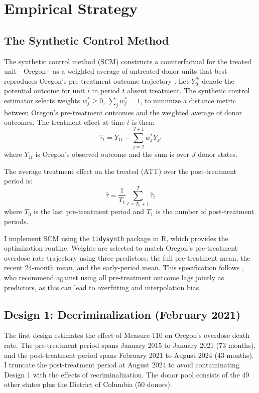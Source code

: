\documentclass[12pt]{article}
\begin{document}
\section{Empirical Strategy}

\subsection{The Synthetic Control Method}

The synthetic control method (SCM) constructs a counterfactual for the treated unit---Oregon---as a weighted average of untreated donor units that best reproduces Oregon's pre-treatment outcome trajectory \citep{abadie2003economic, abadie2010synthetic}. Let $Y_{it}^{N}$ denote the potential outcome for unit $i$ in period $t$ absent treatment. The synthetic control estimator selects weights $w_j^* \geq 0$, $\sum_j w_j^* = 1$, to minimize a distance metric between Oregon's pre-treatment outcomes and the weighted average of donor outcomes. The treatment effect at time $t$ is then:
\begin{equation}
    \hat{\tau}_t = Y_{1t} - \sum_{j=2}^{J+1} w_j^* Y_{jt}
    \label{eq:att_t}
\end{equation}
where $Y_{1t}$ is Oregon's observed outcome and the sum is over $J$ donor states.

The average treatment effect on the treated (ATT) over the post-treatment period is:
\begin{equation}
    \hat{\tau} = \frac{1}{T_1} \sum_{t=T_0+1}^{T} \hat{\tau}_t
    \label{eq:att}
\end{equation}
where $T_0$ is the last pre-treatment period and $T_1$ is the number of post-treatment periods.

I implement SCM using the \texttt{tidysynth} package in R, which provides the \citet{abadie2010synthetic} optimization routine. Weights are selected to match Oregon's pre-treatment overdose rate trajectory using three predictors: the full pre-treatment mean, the recent 24-month mean, and the early-period mean. This specification follows \citet{kaul2022synthetic}, who recommend against using all pre-treatment outcome lags jointly as predictors, as this can lead to overfitting and interpolation bias.

\subsection{Design 1: Decriminalization (February 2021)}

The first design estimates the effect of Measure 110 on Oregon's overdose death rate. The pre-treatment period spans January 2015 to January 2021 (73 months), and the post-treatment period spans February 2021 to August 2024 (43 months). I truncate the post-treatment period at August 2024 to avoid contaminating Design 1 with the effects of recriminalization. The donor pool consists of the 49 other states plus the District of Columbia (50 donors).
\end{document}
